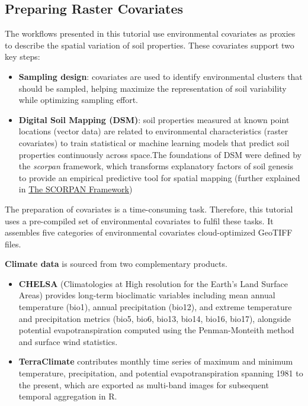 \documentclass[
  10pt,
  b5paper,
  oneside]{book}
\begin{document}
\subsection{Preparing Raster Covariates}\label{preparing-raster-covariates}

The workflows presented in this tutorial use environmental covariates as proxies to describe the spatial variation of soil properties. These covariates support two key steps:

\begin{itemize}
\item
  \textbf{Sampling design}: covariates are used to identify environmental clusters that should be sampled, helping maximize the representation of soil variability while optimizing sampling effort.
\item
  \textbf{Digital Soil Mapping (DSM)}: soil properties measured at known point locations (vector data) are related to environmental characteristics (raster covariates) to train statistical or machine learning models that predict soil properties continuously across space.The foundations of DSM were defined by the \emph{scorpan} framework, which transforms explanatory factors of soil genesis to provide an empirical predictive tool for spatial mapping (further explained in \hyperref[SCORPAN-Framework]{The SCORPAN Framework})
\end{itemize}

The preparation of covariates is a time-consuming task. Therefore, this tutorial uses a pre-compiled set of environmental covariates to fulfil these tasks. It assembles five categories of environmental covariates cloud-optimized GeoTIFF files.

\textbf{Climate data} is sourced from two complementary products.

\begin{itemize}
\item
  \textbf{CHELSA} (Climatologies at High resolution for the Earth's Land Surface Areas) provides long-term bioclimatic variables including mean annual temperature (bio1), annual precipitation (bio12), and extreme temperature and precipitation metrics (bio5, bio6, bio13, bio14, bio16, bio17), alongside potential evapotranspiration computed using the Penman-Monteith method and surface wind statistics.
\item
  \textbf{TerraClimate} contributes monthly time series of maximum and minimum temperature, precipitation, and potential evapotranspiration spanning 1981 to the present, which are exported as multi-band images for subsequent temporal aggregation in R.
\end{itemize}
\end{document}
